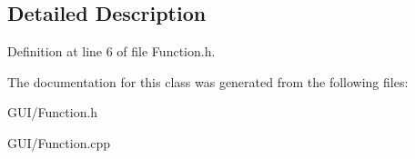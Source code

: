 \subsection{Detailed Description}


Definition at line 6 of file Function.\+h.



The documentation for this class was generated from the following files\+:\begin{DoxyCompactItemize}
\item 
G\+U\+I/Function.\+h\item 
G\+U\+I/Function.\+cpp\end{DoxyCompactItemize}
